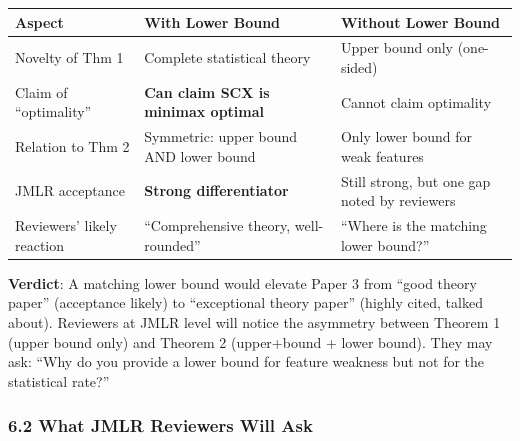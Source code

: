 \documentclass[
  12pt,
]{ctexart}
\begin{document}
\begin{longtable}[]{@{}
  >{\raggedright\arraybackslash}p{}
  >{\raggedright\arraybackslash}p{}
  >{\raggedright\arraybackslash}p{}@{}}
\toprule\noalign{}
\begin{minipage}[b]{\linewidth}\raggedright
Aspect
\end{minipage} & \begin{minipage}[b]{\linewidth}\raggedright
With Lower Bound
\end{minipage} & \begin{minipage}[b]{\linewidth}\raggedright
Without Lower Bound
\end{minipage} \\
\midrule\noalign{}
\endhead
\bottomrule\noalign{}
\endlastfoot
Novelty of Thm 1 & Complete statistical theory & Upper bound only
(one-sided) \\
Claim of ``optimality'' & \textbf{Can claim SCX is minimax optimal} &
Cannot claim optimality \\
Relation to Thm 2 & Symmetric: upper bound AND lower bound & Only lower
bound for weak features \\
JMLR acceptance & \textbf{Strong differentiator} & Still strong, but one
gap noted by reviewers \\
Reviewers' likely reaction & ``Comprehensive theory, well-rounded'' &
``Where is the matching lower bound?'' \\
\end{longtable}

\textbf{Verdict}: A matching lower bound would elevate Paper 3 from
``good theory paper'' (acceptance likely) to ``exceptional theory
paper'' (highly cited, talked about). Reviewers at JMLR level will
notice the asymmetry between Theorem 1 (upper bound only) and Theorem 2
(upper+bound + lower bound). They may ask: ``Why do you provide a lower
bound for feature weakness but not for the statistical rate?''

\subsubsection{6.2 What JMLR Reviewers Will
Ask}\label{what-jmlr-reviewers-will-ask}
\end{document}
